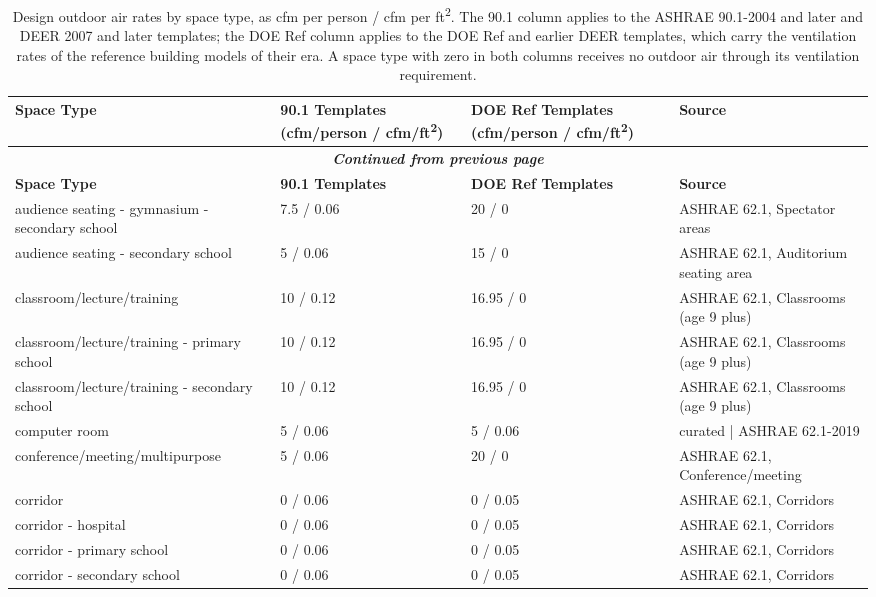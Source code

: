 \begin{center}
\scriptsize
\begin{longtable}{|p{2.1in}|p{1.05in}|p{1.05in}|p{2.1in}|}
\caption[Design Outdoor Air Rates by Space Type]{Design outdoor air rates by space type, as cfm per person / cfm per ft\textsuperscript{2}. The 90.1 column applies to the ASHRAE 90.1-2004 and later and DEER 2007 and later templates; the DOE Ref column applies to the DOE Ref and earlier DEER templates, which carry the ventilation rates of the reference building models of their era. A space type with zero in both columns receives no outdoor air through its ventilation requirement.} \\ \hline
\label{tab:ventilation_rates}
\textbf{Space Type} & \textbf{90.1 Templates (cfm/person / cfm/ft\textsuperscript{2})} & \textbf{DOE Ref Templates (cfm/person / cfm/ft\textsuperscript{2})} & \textbf{Source} \\ \hline
\endfirsthead
\multicolumn{4}{c}{{\bfseries \textit{Continued from previous page}}} \\ \hline
\textbf{Space Type} & \textbf{90.1 Templates} & \textbf{DOE Ref Templates} & \textbf{Source} \\ \hline
\endhead
audience seating - gymnasium - secondary school & 7.5 / 0.06 & 20 / 0 & ASHRAE 62.1, Spectator areas \\ \hline
audience seating - secondary school & 5 / 0.06 & 15 / 0 & ASHRAE 62.1, Auditorium seating area \\ \hline
classroom/lecture/training & 10 / 0.12 & 16.95 / 0 & ASHRAE 62.1, Classrooms (age 9 plus) \\ \hline
classroom/lecture/training - primary school & 10 / 0.12 & 16.95 / 0 & ASHRAE 62.1, Classrooms (age 9 plus) \\ \hline
classroom/lecture/training - secondary school & 10 / 0.12 & 16.95 / 0 & ASHRAE 62.1, Classrooms (age 9 plus) \\ \hline
computer room & 5 / 0.06 & 5 / 0.06 & curated | ASHRAE 62.1-2019 \\ \hline
conference/meeting/multipurpose & 5 / 0.06 & 20 / 0 & ASHRAE 62.1, Conference/meeting \\ \hline
corridor & 0 / 0.06 & 0 / 0.05 & ASHRAE 62.1, Corridors \\ \hline
corridor - hospital & 0 / 0.06 & 0 / 0.05 & ASHRAE 62.1, Corridors \\ \hline
corridor - primary school & 0 / 0.06 & 0 / 0.05 & ASHRAE 62.1, Corridors \\ \hline
corridor - secondary school & 0 / 0.06 & 0 / 0.05 & ASHRAE 62.1, Corridors \\ \hline

\end{longtable}
\end{center}
